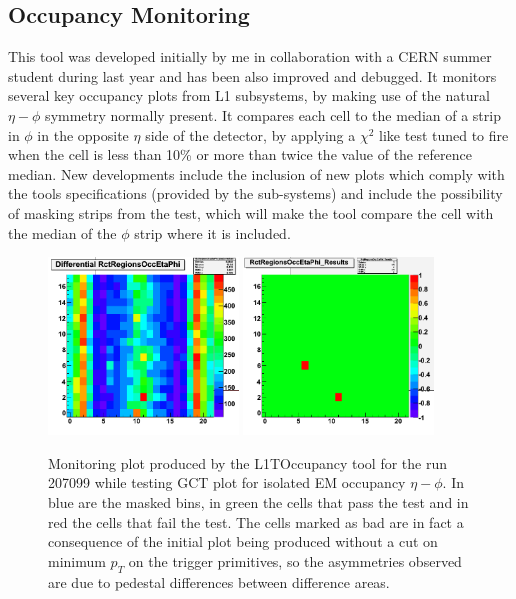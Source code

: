 \subsection{Occupancy Monitoring}


This tool was developed initially by me in collaboration with a CERN summer student during last year and has been
also improved and debugged. It monitors several key occupancy plots from L1 subsystems, by making use of the natural
$\eta-\phi$ symmetry normally present. It compares each cell to the median of a strip in $\phi$ in the opposite $\eta$
side of the detector, by applying a $\chi^{2}$ like test tuned to fire when the cell is less than 10\% or more than
twice the value of the reference median. New developments include the inclusion of new plots which comply with the
tools specifications (provided by the sub-systems) and include the possibility of masking strips from the test, which 
will make the tool compare the cell with the median of the $\phi$ strip where it is included.

\begin{figure}[!htb]
\centering
\includegraphics[width=0.45\textwidth]{Chapter03/L1TOnline/Images/L1TOccupancy_Diff.png}
\includegraphics[width=0.45\textwidth]{Chapter03/L1TOnline/Images/L1TOccupancy_Results.png}
\caption{Monitoring plot produced by the L1TOccupancy tool for the run 207099 while testing GCT plot for isolated
EM occupancy $\eta-\phi$. In blue are the masked bins, in green the cells that pass the test and in red the cells
that fail the test. The cells marked as bad are in fact a consequence of the initial plot being produced without
a cut on minimum $p_T$ on the trigger primitives, so the asymmetries observed are due to pedestal differences between
difference areas.}
\label{figure_ServiceWork_L1TOccupancy}
\end{figure}

